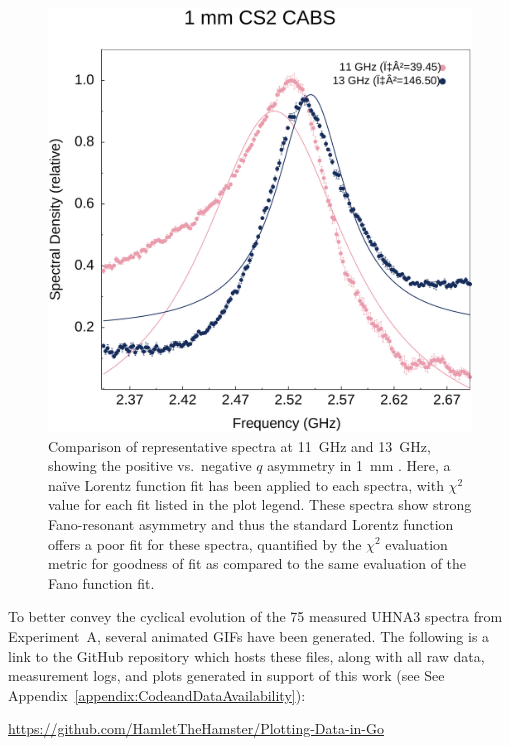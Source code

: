 \begin{figure}[ht]
  \centering
  \includegraphics[width=\textwidth]{figs/3-CoBS/CS2LorentzCompare.pdf}
  \caption{Comparison of representative spectra at \SI{11}{\giga\hertz} and \SI{13}{\giga\hertz}, showing the positive vs.\ negative \(q\) asymmetry in \SI{1}{\milli\meter} . Here, a naïve Lorentz function fit has been applied to each spectra, with \(\chi^{2}\) value for each fit listed in the plot legend. These spectra show strong Fano-resonant asymmetry and thus the standard Lorentz function offers a poor fit for these spectra, quantified by the \(\chi^{2}\) evaluation metric for goodness of fit as compared to the same evaluation of the Fano function fit.}
  \label{fig:CS2LorentzCompare}
\end{figure}

\FloatBarrier

To better convey the cyclical evolution of the 75 measured UHNA3 spectra from Experiment~A, several animated GIFs have been generated. The following is a link to the GitHub repository which hosts these files, along with all raw data, measurement logs, and plots generated in support of this work (see See Appendix~\ref{appendix:CodeandDataAvailability}):

\hfill

\begin{center}
  \url{https://github.com/HamletTheHamster/Plotting-Data-in-Go}
\end{center}

